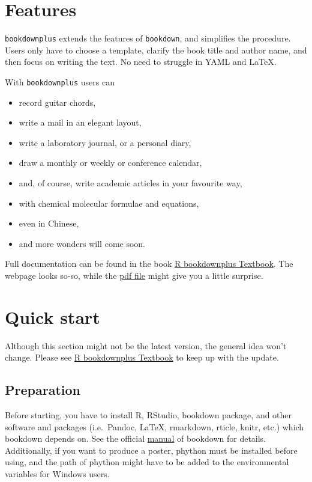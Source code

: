 \documentclass[]{article}
\begin{document}
\section{Features}\label{features}

\texttt{bookdownplus} extends the features of \texttt{bookdown}, and
simplifies the procedure. Users only have to choose a template, clarify
the book title and author name, and then focus on writing the text. No
need to struggle in YAML and LaTeX.

With \texttt{bookdownplus} users can

\begin{itemize}
\item
  record guitar chords,
\item
  write a mail in an elegant layout,
\item
  write a laboratory journal, or a personal diary,
\item
  draw a monthly or weekly or conference calendar,
\item
  and, of course, write academic articles in your favourite way,
\item
  with chemical molecular formulae and equations,
\item
  even in Chinese,
\item
  and more wonders will come soon.
\end{itemize}

Full documentation can be found in the book
\href{https://bookdown.org/baydap/bookdownplus}{R bookdownplus
Textbook}. The webpage looks so-so, while the
\href{https://bookdown.org/baydap/bookdownplus/bookdownplus.pdf}{pdf
file} might give you a little surprise.

\section{Quick start}\label{quick-start}

Although this section might not be the latest version, the general idea
won't change. Please see
\href{https://bookdown.org/baydap/bookdownplus}{R bookdownplus Textbook}
to keep up with the update.

\subsection{Preparation}\label{preparation}

Before starting, you have to install R, RStudio, bookdown package, and
other software and packages (i.e.~Pandoc, LaTeX, rmarkdown, rticle,
knitr, etc.) which bookdown depends on. See the official
\href{https://bookdown.org/yihui/bookdown/}{manual} of bookdown for
details. Additionally, if you want to produce a poster, phython must be
installed before using, and the path of phython might have to be added
to the environmental variables for Windows users.
\end{document}
